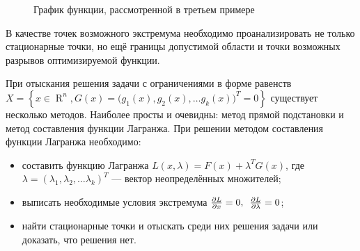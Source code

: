 \documentclass[preprint,russian,a5paper,10pt,twoside,mediummath]{ncc}
\begin{document}
\begin{figure}[ht] \centering
{}
\footnotesize \caption{График функции, рассмотренной в третьем примере\label{fig:extremum:third_example}}
\end{figure}

В качестве точек возможного экстремума необходимо проанализировать не только стационарные точки, но ещё границы допустимой области и точки возможных разрывов оптимизируемой функции.

При отыскания решения задачи с ограничениями в форме равенств $ X=\left\{ x \in \mathop{R}^n, G \left( x \right) = { \bigl( g_1(x), g_2(x),\ldots g_k(x) \bigr) }^T = 0 \right\} $ существует несколько методов. Наиболее просты и очевидны: метод прямой подстановки и метод составления функции Лагранжа. При решении методом составления функции Лагранжа необходимо:
\begin{itemize}
\item составить функцию Лагранжа $ L \left( x, \lambda \right) = F \left( x \right) + \lambda ^T G\left( x \right) $, где $ \lambda = { \left( \lambda _1, \lambda _2,\ldots \lambda _k \right) }^T $ --- вектор неопределённых множителей;
\item выписать необходимые условия экстремума $ \frac{\partial L}{\partial x} = 0, \enskip \frac{\partial L}{\partial \lambda } = 0 $;
\item найти стационарные точки и отыскать среди них решения задачи или доказать, что решения нет.
\end{itemize}
  
\end{document}
